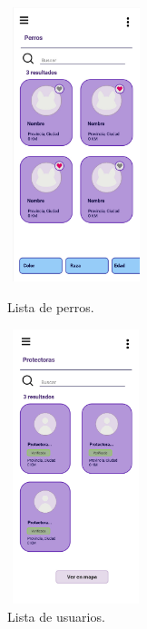 \documentclass[a4paper, 12pt]{article}
\begin{document}
\begin{figure}[H]
   	\begin{minipage}{0.48\textwidth}
		\begin{center}
			{\includegraphics[height=8cm, width=4cm]{DogList.jpg}\par}
			\caption{Lista de perros.}
			\medskip
		\end{center}  
	\end{minipage}\hfill
   	\begin{minipage}{0.48\textwidth}
		\begin{center}
			{\includegraphics[height=8cm, width=4cm]{UserList.jpg}\par}
			\caption{Lista de usuarios.}
			\medskip
		\end{center}  
	\end{minipage}\hfill
\end{figure}
\end{document}
